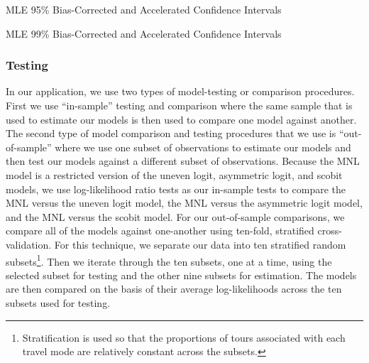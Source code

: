 \begin{landscape}
     \begin{table}
		\centering

		\caption{MLE 95\% Bias-Corrected and Accelerated Confidence Intervals}
		\label{table:in_sample_MLE_interval_95}

		
	\end{table}
\end{landscape}

\begin{landscape}
	\begin{table}
		\centering

		\caption{MLE 99\% Bias-Corrected and Accelerated Confidence Intervals}
		\label{table:in_sample_MLE_interval_99}

		
	\end{table}
\end{landscape}


\subsubsection{Testing}
\label{sec:application_testing_procedures}
In our application, we use two types of model-testing or comparison procedures. First we use ``in-sample'' testing and comparison where the same sample that is used to estimate our models is then used to compare one model against another. The second type of model comparison and testing procedures that we use is ``out-of-sample'' where we use one subset of observations to estimate our models and then test our models against a different subset of observations. Because the MNL model is a restricted version of the uneven logit, asymmetric logit, and scobit models, we use log-likelihood ratio tests as our in-sample tests to compare the MNL versus the uneven logit model, the MNL versus the asymmetric logit model, and the MNL versus the scobit model. For our out-of-sample comparisons, we compare all of the models against one-another using ten-fold, stratified cross-validation. For this technique, we separate our data into ten stratified random subsets\footnote{Stratification is used so that the proportions of tours associated with each travel mode are relatively constant across the subsets.}. Then we iterate through the ten subsets, one at a time, using the selected subset for testing and the other nine subsets for estimation. The models are then compared on the basis of their average log-likelihoods across the ten subsets used for testing.

